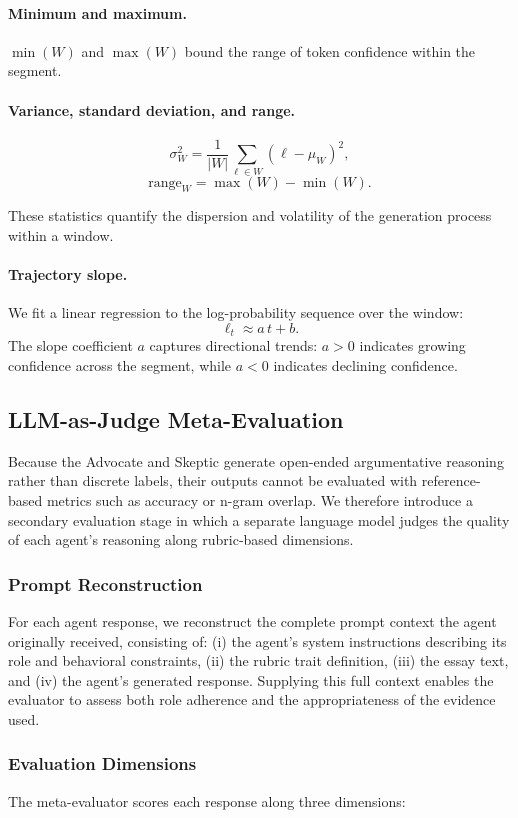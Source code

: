 \documentclass[11pt]{article}
\begin{document}
\paragraph{Minimum and maximum.} $\min(W)$ and $\max(W)$ bound the range of token confidence within the segment.

\paragraph{Variance, standard deviation, and range.}
$$
\sigma_W^2 = \frac{1}{|W|}\sum_{\ell \in W}(\ell - \mu_W)^2,
$$
$$
\text{range}_W = \max(W) - \min(W).
$$

These statistics quantify the dispersion and volatility of the generation process within a window.

\paragraph{Trajectory slope.} We fit a linear regression to the log-probability sequence over the window:
\[
\ell_t \approx a\,t + b.
\]
The slope coefficient $a$ captures directional trends: $a > 0$ indicates growing confidence across the segment, while $a < 0$ indicates declining confidence.

\subsection{LLM-as-Judge Meta-Evaluation}
Because the Advocate and Skeptic generate open-ended argumentative reasoning rather than discrete labels, their outputs cannot be evaluated with reference-based metrics such as accuracy or n-gram overlap. We therefore introduce a secondary evaluation stage in which a separate language model judges the quality of each agent's reasoning along rubric-based dimensions.

\subsubsection{Prompt Reconstruction}
For each agent response, we reconstruct the complete prompt context the agent originally received, consisting of: (i) the agent's system instructions describing its role and behavioral constraints, (ii) the rubric trait definition, (iii) the essay text, and (iv) the agent's generated response. Supplying this full context enables the evaluator to assess both role adherence and the appropriateness of the evidence used.

\subsubsection{Evaluation Dimensions}
The meta-evaluator scores each response along three dimensions:
\end{document}
